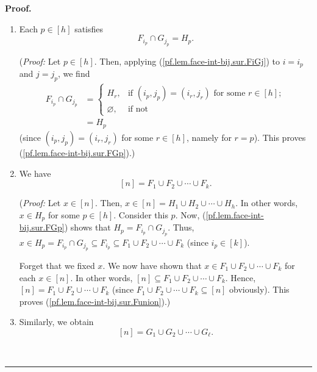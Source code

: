 \documentclass[12pt]{article}
\theoremstyle{definition}%
\theoremstyle{definition}%
\theoremstyle{remark}%
\newcommand{\interval}[1]{\left[ #1 \right]} %
\newenvironment{proof}[1][Proof]{\noindent\textbf{#1.} }{\ \rule{0.5em}{0.5em}}
\begin{document}
\begin{proof}
\begin{enumerate}
We have now proved (\ref{pf.lem.face-int-bij.sur.FiGj-size}) in both Cases 1
and 2; hence (\ref{pf.lem.face-int-bij.sur.FiGj-size}) is proved.)

\item Each $p\in\interval{h} $ satisfies
\begin{equation}
F_{i_{p}}\cap G_{j_{p}}=H_{p}.
\label{pf.lem.face-int-bij.sur.FGp}
\end{equation}


(\textit{Proof:} Let $p\in\interval{h} $. Then, applying
(\ref{pf.lem.face-int-bij.sur.FiGj}) to $i=i_{p}$ and $j=j_{p}$, we find
\begin{align*}
F_{i_{p}}\cap G_{j_{p}} &  =
\begin{cases}
H_{r}, & \text{if }\left(  i_{p},j_{p}\right)  =\left(  i_{r},j_{r}\right)
\text{ for some }r\in\interval{h} ;\\
\varnothing, & \text{if not}
\end{cases}
\\
&  =H_{p}
\end{align*}
(since $\left(  i_{p},j_{p}\right)  =\left(  i_{r},j_{r}\right)  $ for some
$r\in\interval{h} $, namely for $r=p$). This proves
(\ref{pf.lem.face-int-bij.sur.FGp}).)

\item We have
\begin{equation}
\interval{n}=F_{1}\cup F_{2}\cup\cdots\cup F_{k}.
\label{pf.lem.face-int-bij.sur.Funion}
\end{equation}


(\textit{Proof:} Let $x\in\interval{n}$. Then, $x\in\interval{n}
=H_{1}\cup H_{2}\cup\cdots\cup H_{h}$. In other words, $x\in H_{p}$ for some
$p\in\interval{h} $. Consider this $p$. Now,
(\ref{pf.lem.face-int-bij.sur.FGp}) shows that $H_{p}=F_{i_{p}}\cap G_{j_{p}}
$. Thus, $x\in H_{p}=F_{i_{p}}\cap G_{j_{p}}\subseteq F_{i_{p}}\subseteq
F_{1}\cup F_{2}\cup\cdots\cup F_{k}$ (since $i_{p}\in\interval{k}  $).

Forget that we fixed $x$. We now have shown that $x\in F_{1}\cup F_{2}
\cup\cdots\cup F_{k}$ for each $x\in\interval{n}$. In other words,
$\interval{n}\subseteq F_{1}\cup F_{2}\cup\cdots\cup F_{k}$. Hence,
$\interval{n}=F_{1}\cup F_{2}\cup\cdots\cup F_{k}$ (since $F_{1}\cup
F_{2}\cup\cdots\cup F_{k}\subseteq\interval{n}$ obviously). This proves
(\ref{pf.lem.face-int-bij.sur.Funion}).)

\item Similarly, we obtain
\begin{equation}
\interval{n}=G_{1}\cup G_{2}\cup\cdots\cup G_{\ell}.
\label{pf.lem.face-int-bij.sur.Gunion}
\end{equation}



\end{enumerate}
\end{proof}
\end{document}
